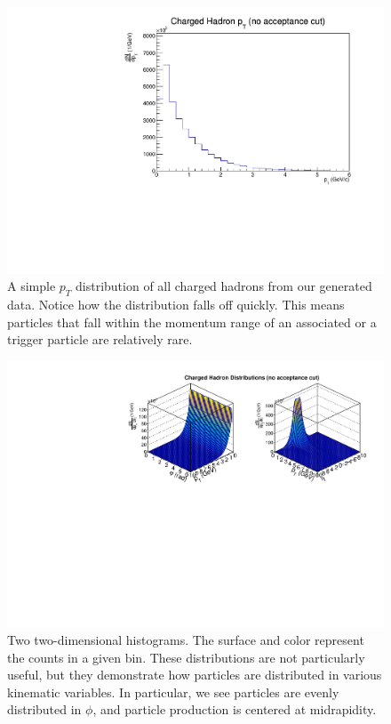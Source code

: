 \documentclass[../main.tex]{subfiles}
\begin{document}
\begin{figure}
    \centering
    \includegraphics[scale=0.5]{analysis/figs/charged_hadron_pt.pdf}
    \caption{A simple $p_T$ distribution of all charged hadrons from our generated data. Notice how the distribution falls off quickly. This means particles that fall within the momentum range of an associated or a trigger particle are relatively rare.}
    \label{fig:pt_dist}
\end{figure}

\begin{figure}
    \centering
    \includegraphics[scale=0.8]{analysis/figs/two_d_dists.pdf}
    \caption{Two two-dimensional histograms. The surface and color represent the counts in a given bin. These distributions are not particularly useful, but they demonstrate how particles are distributed in various kinematic variables. In particular, we see particles are evenly distributed in $\phi$, and particle production is centered at midrapidity.}
    \label{fig:two_d_dist}
\end{figure}
\end{document}

